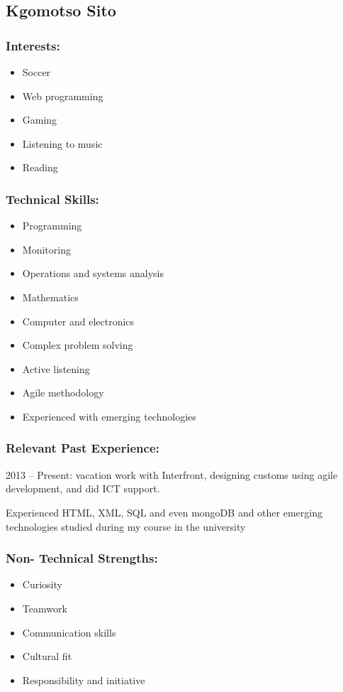 \newpage
\subsection{Kgomotso Sito}
\subsubsection{Interests:}
	\begin{itemize}
		\item Soccer
		\item Web programming
		\item Gaming
		\item Listening to music 
		\item Reading 
	\end{itemize}
\subsubsection{Technical Skills:}
	\begin{itemize}
		\item Programming
		\item Monitoring
		\item Operations and systems analysis
		\item Mathematics
		\item Computer and electronics 
		\item Complex problem solving
		\item Active listening
		\item Agile methodology
		\item Experienced with emerging technologies
	\end{itemize}
	
\subsubsection{Relevant Past Experience:}
\par{2013 – Present: vacation work with Interfront, designing customs using agile development, and did ICT support.
}
\par{Experienced HTML, XML, SQL and even mongoDB and other emerging technologies studied during my course in the university
}
\subsubsection{Non- Technical Strengths:}
\begin{itemize}
		\item Curiosity
		\item Teamwork
		\item Communication skills
		\item Cultural fit
		\item Responsibility and initiative
	\end{itemize}
